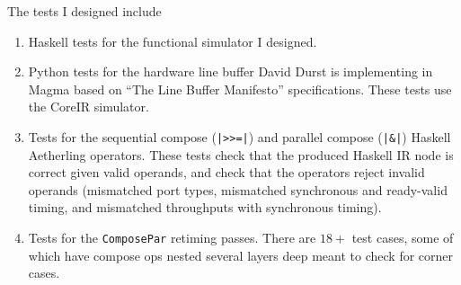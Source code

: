 \documentclass[12pt]{article}
\begin{document}
The tests I designed include
\begin{enumerate}
\item

Haskell tests for the functional simulator I designed.

\item

Python tests for the hardware line buffer David Durst is
implementing in Magma based on ``The Line Buffer Manifesto''
specifications. These tests use the CoreIR simulator.

\item

Tests for the sequential compose (\texttt{|>>=|}) and parallel
compose (\texttt{|\&|}) Haskell Aetherling operators. These tests
check that the produced Haskell IR node is correct given valid
operands, and check that the operators reject invalid operands
(mismatched port types, mismatched synchronous and ready-valid
timing, and mismatched throughputs with synchronous timing).

\item Tests for the \texttt{ComposePar} retiming passes. There are
$18+$ test cases, some of which have compose ops nested several
layers deep meant to check for corner cases.
\end{enumerate}
\end{document}
